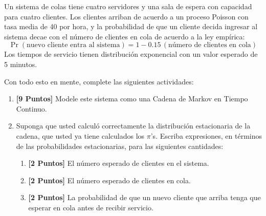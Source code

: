 \documentclass[ a4paper, twoside, 11pt]{article}
\begin{document}
\begin{problem}
Un sistema de colas tiene cuatro servidores y una sala de espera con capacidad para cuatro clientes. Los clientes arriban de acuerdo a un proceso Poisson con tasa media de 40 por hora, y la probabilidad de que un cliente decida ingresar al sistema decae con el n\'umero de clientes en cola de acuerdo a la ley emp\'irica: 
\[
\Pr(\text{nuevo cliente entra al sistema}) = 1 - 0.15 \, (\text{n\'umero de clientes en cola})
\]
Los tiempos de servicio tienen distribuci\'on exponencial con un valor esperado de 5 minutos. 

Con todo esto en mente, complete las siguientes actividades: 
\begin{enumerate}[label=\textbf{\alph*)}]
\item \textbf{[9 Puntos]} Modele este sistema como una Cadena de Markov en Tiempo Continuo. 
\item Suponga que usted calcul\'o correctamente la distribuci\'on estacionaria de la cadena, \ie que usted ya tiene calculados los $\pi$'s. Escriba expresiones, en t\'erminos de las probabilidades estacionarias, para las siguientes cantidades: 
\begin{enumerate}[label=\textbf{\roman*)}]
\item \textbf{[2 Puntos]} El n\'umero esperado de clientes en el sistema. 
\item \textbf{[2 Puntos]} El n\'umero esperado de clientes en cola. 
\item \textbf{[2 Puntos]} La probabilidad de que un nuevo cliente que arriba tenga que esperar en cola antes de recibir servicio. 
\end{enumerate}
\end{enumerate}
\QED

\end{problem}
\fullskip
\end{document}
